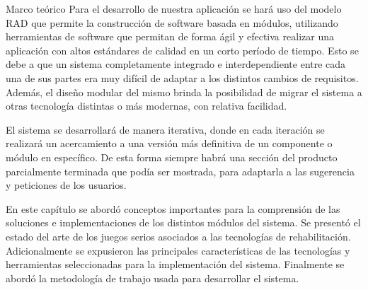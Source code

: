 \begin{thesischapter}{1} {Marco teórico}
    \vspace{2pt}
    Para el desarrollo de nuestra aplicación se hará uso del modelo RAD que permite la construcción de software basada en
    módulos, utilizando herramientas de software que permitan de forma ágil y efectiva realizar una
    aplicación con altos estándares de calidad en un corto período de tiempo. Esto se debe a que un sistema completamente integrado e interdependiente entre cada una de sus
    partes era muy difícil de adaptar a los distintos cambios de requisitos. Además,
    el diseño modular del mismo brinda la posibilidad de migrar el sistema a otras
    tecnología distintas o más modernas, con relativa facilidad.
    
    \vspace{2pt}
    El sistema se desarrollará de manera iterativa, donde en cada iteración se
    realizará un acercamiento a una versión más definitiva de un componente o
    módulo en específico. De esta forma siempre habrá una sección del producto
    parcialmente terminada que podía ser mostrada, para adaptarla a las
    sugerencia y peticiones de los usuarios.

    En este capítulo se abordó conceptos importantes para la comprensión de las
    soluciones e implementaciones de los distintos módulos del sistema. Se presentó el 
    estado del arte de los juegos serios asociados a las tecnologías de rehabilitación. 
    Adicionalmente se expusieron las principales características de las tecnologías y herramientas seleccionadas para la 
    implementación del sistema. Finalmente se abordó la metodología de trabajo usada para 
    desarrollar el sistema. 
\end{thesischapter}